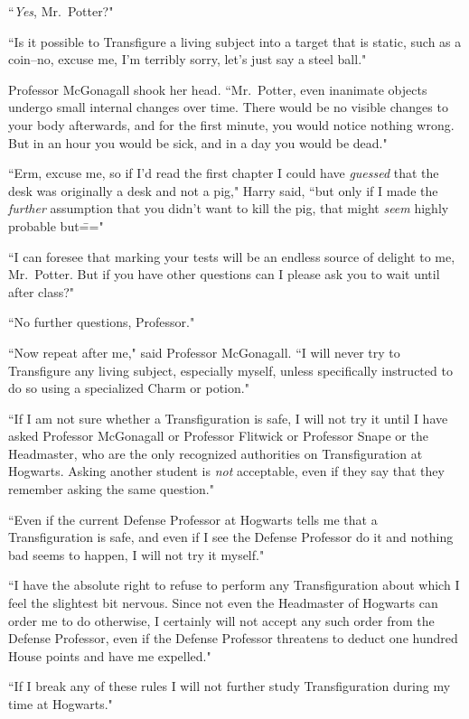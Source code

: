 ``\emph{Yes}, Mr.~Potter?"

``Is it possible to Transfigure a living subject into a target that is static, such as a coin\---no, excuse me, I'm terribly sorry, let's just say a steel ball."

Professor McGonagall shook her head. ``Mr.~Potter, even inanimate objects undergo small internal changes over time. There would be no visible changes to your body afterwards, and for the first minute, you would notice nothing wrong. But in an hour you would be sick, and in a day you would be dead."

``Erm, excuse me, so if I'd read the first chapter I could have \emph{guessed} that the desk was originally a desk and not a pig," Harry said, ``but only if I made the \emph{further} assumption that you didn't want to kill the pig, that might \emph{seem} highly probable but\==="

``I can foresee that marking your tests will be an endless source of delight to me, Mr.~Potter. But if you have other questions can I please ask you to wait until after class?"

``No further questions, Professor."

``Now repeat after me," said Professor McGonagall. ``I will never try to Transfigure any living subject, especially myself, unless specifically instructed to do so using a specialized Charm or potion."

``If I am not sure whether a Transfiguration is safe, I will not try it until I have asked Professor McGonagall or Professor Flitwick or Professor Snape or the Headmaster, who are the only recognized authorities on Transfiguration at Hogwarts. Asking another student is \emph{not} acceptable, even if they say that they remember asking the same question."

``Even if the current Defense Professor at Hogwarts tells me that a Transfiguration is safe, and even if I see the Defense Professor do it and nothing bad seems to happen, I will not try it myself."

``I have the absolute right to refuse to perform any Transfiguration about which I feel the slightest bit nervous. Since not even the Headmaster of Hogwarts can order me to do otherwise, I certainly will not accept any such order from the Defense Professor, even if the Defense Professor threatens to deduct one hundred House points and have me expelled."

``If I break any of these rules I will not further study Transfiguration during my time at Hogwarts."


